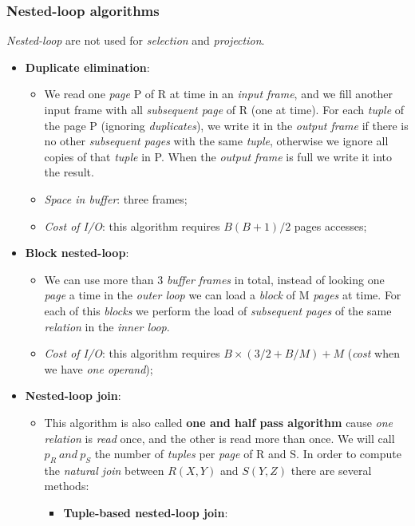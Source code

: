 \documentclass{article}
\begin{document}
\subsubsection{Nested-loop algorithms}
\emph{Nested-loop} are not used for \emph{selection} and \emph{projection}.
\begin{itemize}

\item \textbf{Duplicate elimination}:
\begin{itemize}
\item We read one \emph{page} P of R at time in an \emph{input frame}, and we fill another input frame with all \emph{subsequent page} of R (one at time). For each \emph{tuple} of the page P (ignoring \emph{duplicates}), we write it in the \emph{output frame} if there is no other \emph{subsequent pages} with the same \emph{tuple}, otherwise we ignore all copies of that \emph{tuple} in P. When the \emph{output frame} is full we write it into the result.
\item \emph{Space in buffer}: three frames;
\item \emph{Cost of I/O}: this algorithm requires $B(B+1)/2$ pages accesses;  
\end{itemize}
\item \textbf{Block nested-loop}:
\begin{itemize}
\item We can use more than 3 \emph{buffer frames} in total, instead of looking one \emph{page} a time in the \emph{outer loop} we can load a \emph{block} of M \emph{pages} at time. For each of this \emph{blocks} we perform the load of \emph{subsequent pages} of the same \emph{relation} in the \emph{inner loop}. 
\item \emph{Cost of I/O}: this algorithm requires $B \times (3/2 + B/M) + M$ (\emph{cost} when we have \emph{one operand});
\end{itemize}
\item \textbf{Nested-loop join}:
\begin{itemize}
\item This algorithm is also called \textbf{one and half pass algorithm} cause \emph{one relation} is \emph{read} once, and the other is read more than once. We will call $p_R\ and\ p_S$ the number of \emph{tuples} per \emph{page} of R and S. In order to compute the \emph{natural join} between $R(X,Y)$ and $S(Y,Z)$ there are several methods:
\begin{itemize}
\item \textbf{Tuple-based nested-loop join}:

\end{itemize}
\end{itemize}
\end{itemize}
\end{document}
